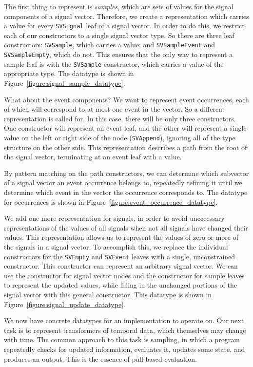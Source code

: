 The first thing to represent is {\em samples}, which are sets of values for
the signal components of a signal vector. Therefore, we create a representation
which carries a value for every {\tt SVSignal} leaf of a signal vector. In order
to do this, we restrict each of our constructors to a single signal vector type.
So there are three leaf constructors: {\tt SVSample}, which carries a value; and
{\tt SVSampleEvent} and {\tt SVSampleEmpty}, which do not. This ensures that the
only way to represent a sample leaf is with the {\tt SVSample} constructor,
which carries a value of the appropriate type. The datatype is shown in
Figure~\ref{figure:signal_sample_datatype}.

What about the event components? We want to represent event occurrences,
each of which will correspond to at most one event in the vector. So a different
representation is called for. In this case, there will be only three
constructors. One constructor will represent an event leaf, and the other will
represent a single value on the left or right side of the node ({\tt SVAppend}),
ignoring all of the type structure on the other side. This representation
describes a path from the root of the signal vector, terminating at an event
leaf with a value.

By pattern matching on the path constructors, we can determine which subvector
of a signal vector an event occurrence belongs to, repeatedly refining it until
we determine which event in the vector the occurrence corresponds to. The
datatype for occurrences is shown in Figure~\ref{figure:event_occurrence_datatype}.

We add one more representation for signals, in order to avoid uneccessary
representations of the values of all signals when not all signals have changed
their values. This representation allows us to represent the values of zero or
more of the signals in a signal vector. To accomplish this, we replace the
individual constructors for the {\tt SVEmpty} and {\tt SVEvent} leaves with %
a single, unconstrained constructor. This constructor can represent an arbitrary
signal vector. We can use the constructor for signal vector nodes and the 
constructor for sample leaves to represent the updated values, while filling
in the unchanged portions of the signal vector with this general constructor.
This datatype is shown in Figure~\ref{figure:signal_update_datatype}.

We now have concrete datatypes for an implementation to operate on. Our next
task is to represent transformers of temporal data, which themselves may change
with time. The common approach to this task is sampling, in which a program
repeatedly checks for updated information, evaluates it, updates some state,
and produces an output. This is the essence of pull-based evaluation.

